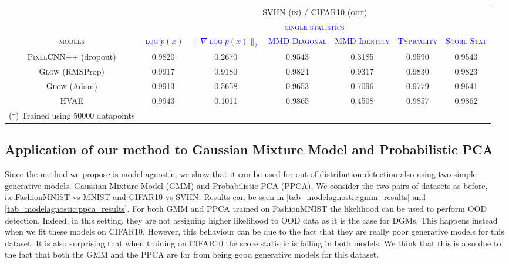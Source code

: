 {\begin{table}[tb]
{\begin{tabular}{ccccccc}
            \bottomrule
            & & & & & & \\
            \toprule
            &\multicolumn{6}{c}{\textsc{SVHN (in) / CIFAR10 (out)}}\\
            \cmidrule{2-7}
            & \multicolumn{6}{c}{\textcolor{blue}{\textsc{single statistics}}}\\
            \cmidrule{2-7}
            \textsc{models}  & \textcolor{blue}{\textsc{$\log p(x)$}} & \textcolor{blue}{\textsc{$\|\nabla \log p(x)\|_2$}} & \textcolor{blue}{\textsc{MMD Diagonal}}  & \textcolor{blue}{\textsc{MMD Identity}} &\textcolor{blue}{\textsc{Typicality}} & \textcolor{blue}{\textsc{Score Stat}}  \\
            \midrule
            \textsc{PixelCNN++} (dropout)  & 0.9820 & 0.2670 &   0.9543 & 0.3185 & 0.9590 & 0.9543 \\
            \textsc{Glow} (RMSProp)  &  0.9917  & 0.9180 & 0.9824 & 0.9317 & 0.9830  &  0.9823 \\
            \textsc{Glow} (Adam)   &0.9913 &  0.5658 & 0.9653 & 0.7096 & 0.9779 &  0.9641 \\
            \textsc{HVAE}  & 0.9943 &  0.1011  &  0.9865 &  0.4508 & 0.9857 &  0.9862\\
            \bottomrule
            ($\dagger$) Trained using 50000 datapoints
        \end{tabular}
        \label{tab_modelagnostic:mmd_pair2}
    }
\end{table}



\subsection{Application of our method to Gaussian Mixture Model and Probabilistic PCA}
\label{appendix_modelagnostic:gmm_ppca}
Since the method we propose is model-agnostic, we show that it can be used for out-of-distribution detection also using two simple generative models, Gaussian Mixture Model (GMM) and Probabilistic PCA (PPCA). We consider the two pairs of datasets as before, i.e.\@ FashionMNIST vs MNIST and CIFAR10 vs SVHN. Results can be seen in \cref{tab_modelagnostic:gmm_results} and \cref{tab_modelagnostic:ppca_results}. For both GMM and PPCA trained on FashionMNIST the likelihood can be used to perform OOD detection. Indeed, in this setting, they are not assigning higher likelihood to OOD data as it is the case for DGMs. This happens instead when we fit these models on CIFAR10. However, this behaviour can be due to the fact that they are really poor generative models for this dataset. It is also surprising that when training on CIFAR10 the score statistic is failing in both models. We think that this is also due to the fact that both the GMM and the PPCA are far from being good generative models for this dataset.


}
